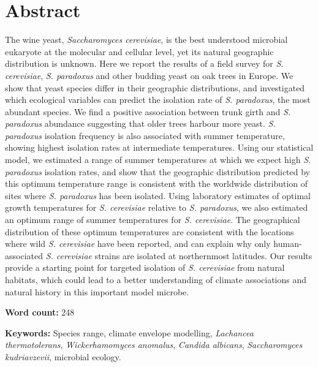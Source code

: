 \documentclass[12pt]{article}
\begin{document}
\section*{Abstract}
\label{sec:Abstract}
\begin{linenumbers}
\doublespacing


The wine yeast, \textit{Saccharomyces cerevisiae}, is the best understood microbial eukaryote at the molecular and cellular level, yet its natural geographic distribution is unknown. Here we report the results of a field survey for \textit{S. cerevisiae}, \textit{S. paradoxus} and other budding yeast on oak trees in Europe. We show that yeast species differ in their geographic distributions, and investigated which ecological variables can predict the isolation rate of \textit{S. paradoxus}, the most abundant species. We find a positive association between trunk girth and \textit{S. paradoxus} abundance suggesting that older trees harbour more yeast. \textit{S. paradoxus} isolation frequency is also associated with summer temperature, showing highest isolation rates at intermediate temperatures. Using our statistical model, we estimated a range of summer temperatures at which we expect high \textit{S. paradoxus} isolation rates, and show that the geographic distribution predicted by this optimum temperature range is consistent with the worldwide distribution of sites where \textit{S. paradoxus} has been isolated. Using laboratory estimates of optimal growth temperatures for \textit{S. cerevisiae} relative to \textit{S. paradoxus}, we also estimated an optimum range of summer temperatures for \textit{S. cerevisiae}. The geographical distribution of these optimum temperatures are consistent with the locations where wild \textit{S. cerevisiae} have been reported, and can explain why only human-associated \textit{S. cerevisiae} strains are isolated at northernmost latitudes. Our results provide a starting point for targeted isolation of \textit{S. cerevisiae} from natural habitats, which could lead to a better understanding of climate associations and natural history in this important model microbe.

\textbf{Word count:} 248

\textbf{Keywords:} Species range, climate envelope modelling, \textit{Lachancea thermotolerans}, \textit{Wickerhamomyces anomalus}, \textit{Candida albicans}, \textit{Saccharomyces kudriavzevii}, microbial ecology. 

\clearpage

\end{linenumbers}
\end{document}
